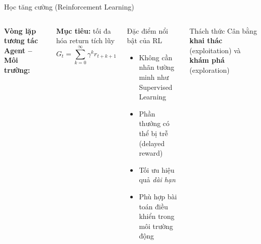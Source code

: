 \begin{frame}{Học tăng cường (Reinforcement Learning)}
  \begin{columns}[T]
    \textbf{Vòng lặp tương tác Agent -- Môi trường:}
    \vspace{6pt}


    \vspace{8pt}
    \textbf{Mục tiêu:} tối đa hóa return tích lũy
    \[G_t = \sum_{k=0}^{\infty}\gamma^k r_{t+k+1}\]

    \begin{block}{Đặc điểm nổi bật của RL}
      \begin{itemize}
        \item Không cần nhãn tường minh như Supervised Learning
        \item Phần thưởng có thể bị trễ (delayed reward)
        \item Tối ưu hiệu quả \textit{dài hạn}
        \item Phù hợp bài toán điều khiển trong môi trường động
      \end{itemize}
    \end{block}
    \vspace{4pt}
    \begin{alertblock}{Thách thức}
      Cân bằng \textbf{khai thác} (exploitation) và \textbf{khám phá} (exploration)
    \end{alertblock}
  \end{columns}
\end{frame}

